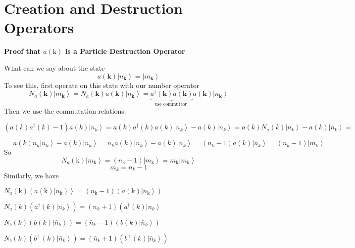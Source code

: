 \section{Creation and Destruction Operators}
\textbf{Proof that $a(\mathrm{k})$ is a Particle Destruction Operator}

What can we say about the state
$$
a(\mathbf{k})\left|n_{\mathbf{k}}\right\rangle=\left|m_{\mathbf{k}}\right\rangle
$$
To see this, first operate on this state with our number operator
$$
N_{a}(\mathbf{k})\left|m_{\mathbf{k}}\right\rangle= N_{a}(\mathbf{k}) a(\mathbf{k})\left|n_{\mathbf{k}}\right\rangle=\underbrace{a^{\dagger}(\mathbf{k}) a(\mathbf{k})}_{\text {use commuttor }} a(\mathbf{k})\left|n_{\mathbf{k}}\right\rangle
$$
Then we use the commutation relations:

$\left(a(k) a^{\dagger}(k)-1\right) a(k)\left|n_{k}\right\rangle= a(k) a^{\dagger}(k) a(k)\left|n_{k}\right\rangle- a(k)\left|n_{k}\right\rangle= a(k) N_{a}(k)\left|n_{k}\right\rangle- a(k)\left|n_{k}\right\rangle=$

$= a(k) n_{k}\left|n_{k}\right\rangle- a(k)\left|n_{k}\right\rangle= n_{k} a(k)\left|n_{k}\right\rangle- a(k)\left|n_{k}\right\rangle=\left(n_{k}-1\right) a(k)\left|n_{k}\right\rangle=\left(n_{k}-1\right)\left|m_{k}\right\rangle$
So
$$
N_{a}(\mathrm{k})\left|m_{\mathrm{k}}\right\rangle=\left(n_{\mathrm{k}}-1\right)\left|m_{\mathrm{k}}\right\rangle= m_{\mathrm{k}}\left|m_{\mathrm{k}}\right\rangle
$$
$$
m_{k}=n_{k}-1
$$
Similarly, we have

$\left.N_{a}(\mathrm{k})\left(a(\mathrm{k}) | n_{\mathrm{k}}\right)\right\rangle=\left(n_{\mathrm{k}}-1\right)\left(a(\mathrm{k})\left|n_{\mathrm{k}}\right\rangle\right)$

$N_{a}(k)\left(a^{\dagger}(k)\left|n_{k}\right\rangle\right)=\left(n_{k}+1\right)\left(a^{\dagger}(k)\left|n_{k}\right\rangle\right.$

$N_{b}(k)\left(b(k)\left|\bar{n}_{k}\right\rangle\right)=\left(\bar{n}_{k}-1\right)\left(b(k)\left|\bar{n}_{k}\right\rangle\right)$

$N_{b}(k)\left(b^{+}(k)\left|\bar{n}_{k}\right\rangle\right)=\left(\bar{n}_{k}+1\right)\left(b^{+}(k)\left|\bar{n}_{k}\right\rangle\right)$


